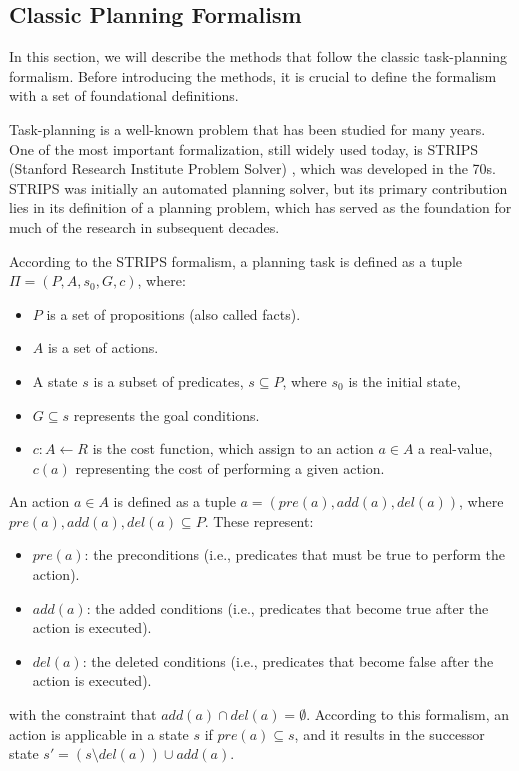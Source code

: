 \subsection{Classic Planning Formalism}
\label{sec:pddl_formalism}
In this section, we will describe the methods that follow the classic task-planning formalism. Before introducing the methods, it is crucial to define the formalism with a set of foundational definitions.

Task-planning is a well-known problem that has been studied for many years. One of the most important formalization, still widely used today, is STRIPS (Stanford Research Institute Problem Solver) \cite{fikes1971strips}, which was developed in the 70s. STRIPS was initially an automated planning solver, but its primary contribution lies in its definition of a planning problem, which has served as the foundation for much of the research in subsequent decades.

According to the STRIPS formalism, a planning task is defined as a tuple $\Pi = (P, A, s_0, G, c)$, where:
\begin{itemize}
    \item $P$ is a set of propositions (also called facts).
    \item $A$ is a set of actions.
    \item A state $s$ is a subset of predicates, $s \subseteq P$, where $s_0$ is the initial state,
    \item $G \subseteq s$ represents the goal conditions.
    \item $c: A \leftarrow R$ is the cost function, which assign to an action $a \in A$ a real-value, $c(a)$ representing the cost of performing a given action.
\end{itemize}

An action $a \in A$ is defined as a tuple $a = \left(pre(a), add(a), del(a)\right)$, where $pre(a), add(a), del(a) \subseteq P$. These represent:
\begin{itemize}
    \item $pre(a)$: the preconditions (i.e., predicates that must be true to perform the action).
    \item $add(a)$: the added conditions (i.e., predicates that become true after the action is executed).
    \item $del(a)$: the deleted conditions (i.e., predicates that become false after the action is executed).
\end{itemize}
with the constraint that $add(a) \cap del(a) = \emptyset$. According to this formalism, an action is applicable in a state $s$ if $pre(a) \subseteq s$, and it results in the successor state $s' = (s \setminus del(a)) \cup add(a)$.

